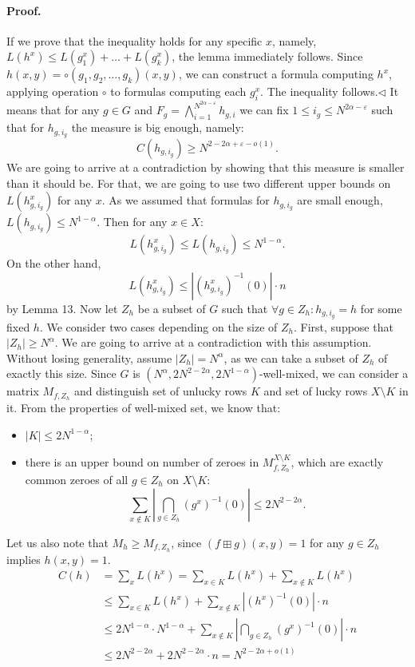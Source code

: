 \documentclass[10pt,a4paper]{article}
\begin{document}
\paragraph{Proof.} If we prove that the inequality holds for any specific $x$, namely, $L(h^x)\leq L(g_1^x)+\ldots+L(g_k^x)$, the lemma immediately follows.
Since $h(x,y)=\circ(g_1,g_2,\ldots,g_k)(x,y)$, we can construct a formula computing $h^x$, applying operation $\circ$ to formulas computing each $g_i^x$. The inequality follows.\hfill$\triangleleft$
It means that for any $g\in G$ and $F_g=\bigwedge_{i=1}^{N^{2\alpha-\varepsilon}}h_{g,i}$ we can fix $1\leq i_g\leq N^{2\alpha-\varepsilon}$ such that for $h_{g,i_g}$ the measure is big enough, namely:
\[C(h_{g,i_g})\geq N^{2-2\alpha+\varepsilon-o(1)}.\]
We are going to arrive at a contradiction by showing that this measure is smaller than it should be. For that, we are going to use two different upper bounds on $L(h_{g,i_g}^x)$ for any $x$. As we assumed that formulas for $h_{g,i_g}$ are small enough, $L(h_{g,i_g})\leq N^{1-\alpha}$. Then for any $x\in X$:
\[L(h_{g,i_g}^x)\leq L(h_{g,i_g})\leq N^{1-\alpha}.\]
On the other hand,
\[L(h_{g,i_g}^x)\leq|(h_{g,i_g}^x)^{-1}(0)|\cdot n\]
by Lemma 13.
Now let $Z_h$ be a subset of $G$ such that $\forall g\in Z_h:h_{g,i_g}=h$ for some fixed $h$.
We consider two cases depending on the size of $Z_h$. First, suppose that $|Z_h|\geq N^\alpha$. We are going to arrive at a contradiction with this assumption. Without losing generality, assume $|Z_h|=N^\alpha$, as we can take a subset of $Z_h$ of exactly this size. Since $G$ is $(N^\alpha,2N^{2-2\alpha},2N^{1-\alpha})$-well-mixed, we can consider a matrix $M_{f,Z_h}$ and distinguish set of unlucky rows $K$ and set of lucky rows $X\setminus K$ in it.
From the properties of well-mixed set, we know that:
\begin{itemize}
\item $|K|\leq2N^{1-\alpha}$;
\item there is an upper bound on number of zeroes in $M_{f,Z_h}^{X\setminus K}$, which are exactly common zeroes of all $g\in Z_h$ on $X\setminus K$:
\[\sum_{x\notin K}\left|\bigcap_{g\in Z_h}(g^x)^{-1}(0)\right|\leq2N^{2-2\alpha}.\]
\end{itemize}
Let us also note that $M_h\geq M_{f,Z_h}$, since $(f\boxplus g)(x,y)=1$ for any $g\in Z_h$ implies $h(x,y)=1$.
\begin{align*}
C(h)&=\sum_xL(h^x)=\sum_{x\in K}L(h^x)+\sum_{x\notin K}L(h^x)\\
&\leq\sum_{x\in K}L(h^x)+\sum_{x\notin K}|(h^x)^{-1}(0)|\cdot n\\
&\leq2N^{1-\alpha}\cdot N^{1-\alpha}+\sum_{x\notin K}\left|\bigcap_{g\in Z_h}(g^x)^{-1}(0)\right|\cdot n\\
&\leq2N^{2-2\alpha}+2N^{2-2\alpha}\cdot n=N^{2-2\alpha+o(1)}
\end{align*}
\end{document}
